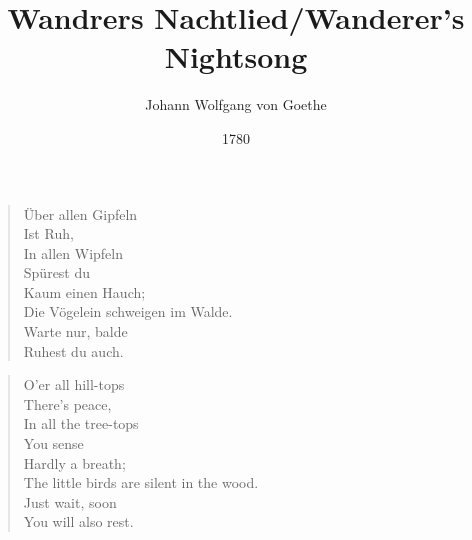 \documentclass[12pt,english]{article}
\begin{document}
\title{Wandrers Nachtlied/Wanderer's Nightsong}
\author{Johann Wolfgang von Goethe}
\date{1780}

\maketitle

\begin{minipage}{0.48\linewidth}
  \begin{verse}
    Über allen Gipfeln\\
    Ist Ruh,\\
    In allen Wipfeln\\
    Spürest du\\
    Kaum einen Hauch;\\
    Die Vögelein schweigen im Walde.\\
    Warte nur, balde\\
    Ruhest du auch.
  \end{verse}
\end{minipage}
\begin{minipage}{0.48\linewidth}
  \begin{verse}
    O'er all hill-tops\\
    There's peace,\\
    In all the tree-tops\\
    You sense\\
    Hardly a breath;\\
    The little birds are silent in the wood.\\
    Just wait, soon\\
    You will also rest.
  \end{verse}
\end{minipage}
\end{document}
